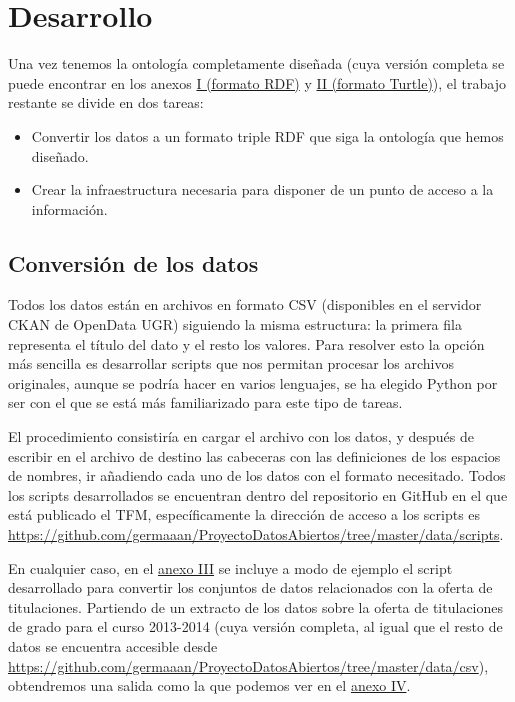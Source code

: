 \chapter{Desarrollo}

Una vez tenemos la ontología completamente diseñada (cuya versión completa se puede encontrar en los anexos \hyperref[anexo_i]{I (formato RDF)} y \hyperref[anexo_ii]{II (formato Turtle)}), el trabajo restante se divide en dos tareas:

\begin{itemize}
	\item Convertir los datos a un formato triple {\sf RDF} que siga la ontología que hemos diseñado.
	\item Crear la infraestructura necesaria para disponer de un punto de acceso a la información.
\end{itemize}

\section{Conversión de los datos}

Todos los datos están en archivos en formato {\sf CSV} (disponibles en el servidor C{\sf KAN} de {\sf OpenData UGR}) siguiendo la misma estructura: la primera fila representa el título del dato y el resto los valores. Para resolver esto la opción más sencilla es desarrollar scripts que nos permitan procesar los archivos originales, aunque se podría hacer en varios lenguajes, se ha elegido {\sf Python} por ser con el que se está más familiarizado para este tipo de tareas.

\bigskip
El procedimiento consistiría en cargar el archivo con los datos, y después de escribir en el archivo de destino las cabeceras con las definiciones de los espacios de nombres, ir añadiendo cada uno de los datos con el formato necesitado. Todos los scripts desarrollados se encuentran dentro del repositorio en {\sf GitHub} en el que está publicado el {\sf TFM}, específicamente la dirección de acceso a los scripts es \url{https://github.com/germaaan/ProyectoDatosAbiertos/tree/master/data/scripts}. 

\newpage
En cualquier caso, en el \hyperref[anexo_ii]{anexo III} se incluye a modo de ejemplo el script desarrollado para convertir los conjuntos de datos relacionados con la oferta de titulaciones. Partiendo de un extracto de los datos sobre la oferta de titulaciones de grado para el curso 2013-2014 (cuya versión completa, al igual que el resto de datos se encuentra accesible desde \url{https://github.com/germaaan/ProyectoDatosAbiertos/tree/master/data/csv}), obtendremos una salida como la que podemos ver en el \hyperref[anexo_ii]{anexo IV}.

